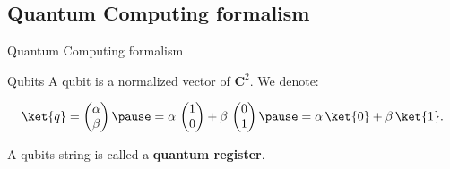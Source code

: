 \documentclass{beamer}
\begin{document}
\subsection{Quantum Computing formalism}

\begin{frame}{Quantum Computing formalism}
    \begin{block}{Qubits}
        A qubit  is a normalized vector of $\mathbf{C}^2$. We denote:
        
        \[\ket{q}=\begin{pmatrix}\alpha\\\beta\end{pmatrix}\pause=\alpha\,\begin{pmatrix}1\\0\end{pmatrix} + \beta\,\begin{pmatrix}0\\1\end{pmatrix}\pause=\alpha\,\ket{0}+\beta\,\ket{1}.\]
        
        \pause A qubits-string is called a \textbf{quantum register}.
    \end{block}
\end{frame}
\end{document}
